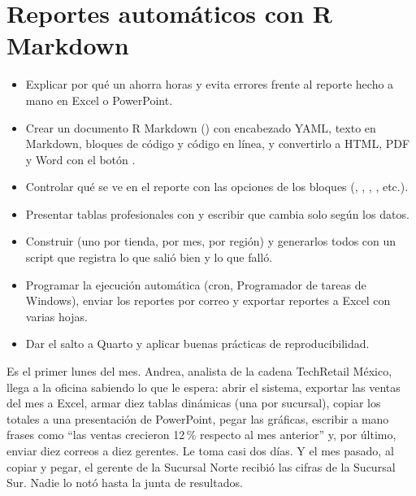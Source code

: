 \chapter{Reportes automáticos con R Markdown}
\label{cap:reportes}

\begin{objetivos}
\begin{itemize}
  \item Explicar por qué un  ahorra horas y
        evita errores frente al reporte hecho a mano en Excel o PowerPoint.
  \item Crear un documento R Markdown () con encabezado YAML,
        texto en Markdown, bloques de código y código en línea, y convertirlo
        a HTML, PDF y Word con el botón .
  \item Controlar qué se ve en el reporte con las opciones de los bloques
        (, , ,
        , etc.).
  \item Presentar tablas profesionales con  y
        escribir  que cambia solo según los datos.
  \item Construir  (uno por tienda, por
        mes, por región) y generarlos todos con un script que registra lo
        que salió bien y lo que falló.
  \item Programar la ejecución automática (cron, Programador de tareas de
        Windows), enviar los reportes por correo y exportar reportes a Excel
        con varias hojas.
  \item Dar el salto a Quarto y aplicar buenas prácticas de reproducibilidad.
\end{itemize}
\end{objetivos}

Es el primer lunes del mes. Andrea, analista de la cadena TechRetail México,
llega a la oficina sabiendo lo que le espera: abrir el sistema, exportar las
ventas del mes a Excel, armar diez tablas dinámicas (una por sucursal), copiar
los totales a una presentación de PowerPoint, pegar las gráficas, escribir a
mano frases como ``las ventas crecieron 12\,\% respecto al mes anterior'' y,
por último, enviar diez correos a diez gerentes. Le toma casi dos días. Y el
mes pasado, al copiar y pegar, el gerente de la Sucursal Norte recibió las
cifras de la Sucursal Sur. Nadie lo notó hasta la junta de resultados.

